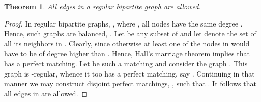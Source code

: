 \documentclass[times, 11pt]{article}
\newtheorem{theorem}{Theorem}[section]
\begin{document}
\begin{theorem} All edges in a regular bipartite graph are allowed.
\end{theorem}

\begin{proof} In regular bipartite graphs, , where , all nodes have the same degree . Hence, such graphs are balanced, .
Let  be any subset of  and let  denote the set of all its neighbors in . Clearly,  since otherwise at least one of the nodes
in  would have to be of degree higher than . Hence, Hall's marriage theorem \cite{Hall} implies that  has a perfect matching.
Let  be such a matching and consider the graph . This graph is -regular, whence it too has a perfect matching, say .
Continuing in that manner we may construct  disjoint perfect matchings, , such that . It follows that
all edges in  are allowed.
\end{proof}

\newpage


\end{document}
